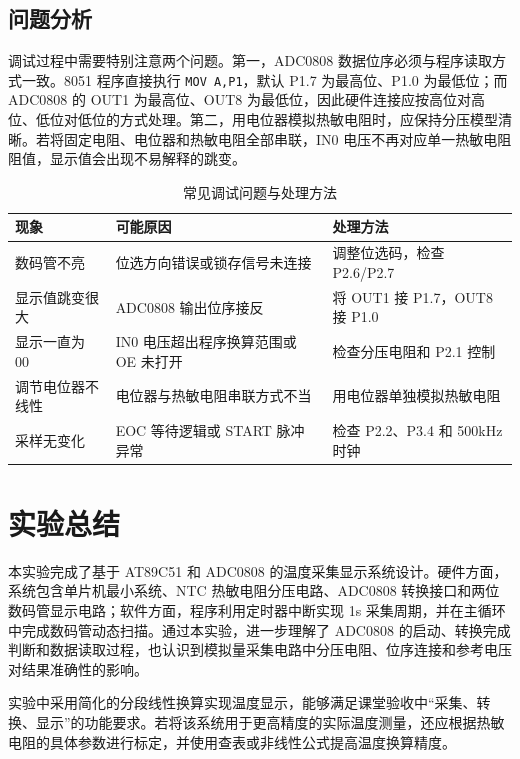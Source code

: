 \subsection{问题分析}
调试过程中需要特别注意两个问题。第一，ADC0808 数据位序必须与程序读取方式一致。8051 程序直接执行 \texttt{MOV A,P1}，默认 P1.7 为最高位、P1.0 为最低位；而 ADC0808 的 OUT1 为最高位、OUT8 为最低位，因此硬件连接应按高位对高位、低位对低位的方式处理。第二，用电位器模拟热敏电阻时，应保持分压模型清晰。若将固定电阻、电位器和热敏电阻全部串联，IN0 电压不再对应单一热敏电阻阻值，显示值会出现不易解释的跳变。

\begin{table}[H]
  \centering
  \caption{常见调试问题与处理方法}
  \renewcommand{\arraystretch}{1.35}
  \begin{tabular}{p{}p{}p{}}
    \toprule
    现象 & 可能原因 & 处理方法 \\
    \midrule
    数码管不亮 & 位选方向错误或锁存信号未连接 & 调整位选码，检查 P2.6/P2.7 \\
    显示值跳变很大 & ADC0808 输出位序接反 & 将 OUT1 接 P1.7，OUT8 接 P1.0 \\
    显示一直为 00 & IN0 电压超出程序换算范围或 OE 未打开 & 检查分压电阻和 P2.1 控制 \\
    调节电位器不线性 & 电位器与热敏电阻串联方式不当 & 用电位器单独模拟热敏电阻 \\
    采样无变化 & EOC 等待逻辑或 START 脉冲异常 & 检查 P2.2、P3.4 和 500kHz 时钟 \\
    \bottomrule
  \end{tabular}
\end{table}

\section{实验总结}

本实验完成了基于 AT89C51 和 ADC0808 的温度采集显示系统设计。硬件方面，系统包含单片机最小系统、NTC 热敏电阻分压电路、ADC0808 转换接口和两位数码管显示电路；软件方面，程序利用定时器中断实现 1s 采集周期，并在主循环中完成数码管动态扫描。通过本实验，进一步理解了 ADC0808 的启动、转换完成判断和数据读取过程，也认识到模拟量采集电路中分压电阻、位序连接和参考电压对结果准确性的影响。

实验中采用简化的分段线性换算实现温度显示，能够满足课堂验收中“采集、转换、显示”的功能要求。若将该系统用于更高精度的实际温度测量，还应根据热敏电阻的具体参数进行标定，并使用查表或非线性公式提高温度换算精度。
